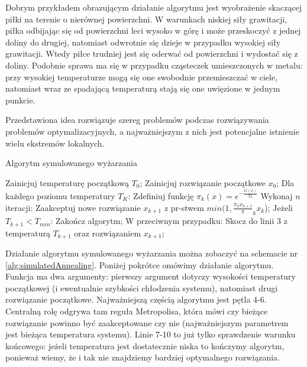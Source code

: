 \documentclass{pracamgr}
\begin{document}
Dobrym przykładem obrazującym działanie algorytmu jest wyobrażenie skaczącej piłki na terenie 
o nierównej powierzchni.
W warunkach niskiej siły grawitacji, piłka odbijając się od powierzchni leci wysoko w górę i może
przeskoczyć z jednej doliny do drugiej, natomiast odwrotnie się dzieje w przypadku wysokiej siły
grawitacji. Wtedy piłce trudniej jest się oderwać od powierzchni i wydostać się z doliny. Podobnie
sprawa ma się w przypadku cząsteczek umieszczonych w metalu: przy wysokiej 
temperaturze mogą się one swobodnie przemieszczać w ciele, natomiast wraz ze spadającą temperaturą 
stają się one uwięzione w jednym punkcie.

Przedstawiona idea rozwiązuje szereg problemów podczas rozwiązywania problemów optymalizacyjnych, a 
najważniejszym z nich jest potencjalne istnienie wielu ekstremów lokalnych.

\begin{algorithm}[H]
\caption{Algorytm symulowanego wyżarzania}\label{euclid}

\begin{algorithmic}[1]
  
  \State Zainicjuj temperaturę początkową $T_0$;
  \State Zainicjuj rozwiązanie początkowe $x_0$;
  \State Dla każdego poziomu temperatury $T_K$:
  \State  \hspace{\algorithmicindent} Zdefiniuj funkcję $\pi_k(x) = e^{- \frac{G(x)}{T_k}}$
  \State  \hspace{\algorithmicindent}    Wykonaj $n$ iteracji:
  \State    \hspace{\algorithmicindent} \hspace{\algorithmicindent}       Zaakceptuj nowe rozwiązanie $x_{k+1}$ z pr-stwem $min(1, \frac{\pi_k{x_{k+1}}}\pi_k{{x_{k}}}$);
  \State Jeżeli $T_{k+1} < T_{min}$:
  \State  \hspace{\algorithmicindent}    Zakończ algorytm;
  \State W przeciwnym przypadku:
  \State   \hspace{\algorithmicindent}   Skocz do linii 3 z temperaturą $T_{k+1}$ oraz rozwiązaniem $x_{k+1}$;

\end{algorithmic}
\label{alg:simulatedAnnealing}
\end{algorithm}

Działanie algorytmu symulowanego wyżarzania można zobaczyć na schemacie nr 
\ref{alg:simulatedAnnealing}. Poniżej pokrótce omówimy działanie algorytmu.
Funkcja ma dwa argumenty: pierwszy argument dotyczy wysokości temperatury początkowej (i ewentualnie
szybkości chłodzenia systemu), natomiast drugi rozwiązanie początkowe.
Najważniejszą częścią algorytmu jest pętla 4-6. 
Centralną rolę odgrywa tam reguła Metropolisa, która mówi czy bieżące rozwiązanie powinno być 
zaakceptowane czy nie (najważniejszym parametrem jest bieżąca temperatura systemu). 
Linie 7-10 to już tylko sprawdzenie warunku końcowego: jeżeli temperatura jest dostatecznie 
niska to kończymy algorytm, ponieważ wiemy, że i tak nie znajdziemy bardziej optymalnego rozwiązania.
\end{document}
